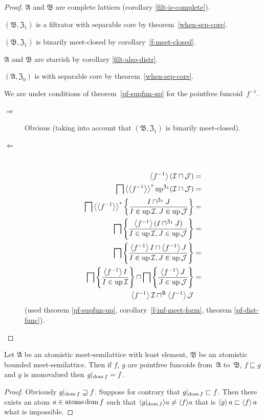 \begin{proof}
$\mathfrak{A}$ and $\mathfrak{B}$ are complete lattices (corollary
\ref{filt-is-complete}).

$(\mathfrak{B},\mathfrak{Z}_{1})$ is a filtrator with separable core
by theorem~\ref{when-sep-core}.

$(\mathfrak{B},\mathfrak{Z}_{1})$ is binarily meet-closed by
corollary~\ref{f-meet-closed}.

$\mathfrak{A}$ and $\mathfrak{B}$ are starrish by corollary \ref{filt-also-distr}.

$(\mathfrak{A},\mathfrak{Z}_{0})$ is with separable core by theorem~\ref{when-sep-core}.

We are under conditions of theorem~\ref{pf-supfun-up} for the pointfree funcoid~$f^{-1}$.
\begin{description}
\item [{$\Rightarrow$}] Obvious (taking into account that $(\mathfrak{B},\mathfrak{Z}_{1})$
is binarily meet-closed).
\item [{$\Leftarrow$}] ~
\begin{align*}
\left\langle f^{-1}\right\rangle(\mathcal{I}\sqcap\mathcal{J}) & =\\
\bigsqcap\left\langle \left\langle f^{-1}\right\rangle\right\rangle ^{\ast}\operatorname{up}^{\mathfrak{Z}_{1}}(\mathcal{I}\sqcap\mathcal{J}) & =\\
\bigsqcap\left\langle \left\langle f^{-1}\right\rangle\right\rangle ^{\ast}\left\{ \frac{I\sqcap^{\mathfrak{Z}_{1}}J}{I\in\operatorname{up}\mathcal{I},J\in\operatorname{up}\mathcal{J}}\right\} & =\\
\bigsqcap\left\{ \frac{\left\langle f^{-1}\right\rangle(I\sqcap^{\mathfrak{Z}_{1}}J)}{I\in\operatorname{up}\mathcal{I},J\in\operatorname{up}\mathcal{J}}\right\} & =\\
\bigsqcap\left\{ \frac{\left\langle f^{-1}\right\rangle I\sqcap\left\langle f^{-1}\right\rangle J}{I\in\operatorname{up}\mathcal{I},J\in\operatorname{up}\mathcal{J}}\right\} & =\\
\bigsqcap\left\{ \frac{\left\langle f^{-1}\right\rangle I}{I\in\operatorname{up}\mathcal{I}}\right\}\sqcap\bigsqcap\left\{ \frac{\left\langle f^{-1}\right\rangle J}{J\in\operatorname{up}\mathcal{J}}\right\} & =\\
\left\langle f^{-1}\right\rangle\mathcal{I}\sqcap^{\mathfrak{A}}\left\langle f^{-1}\right\rangle\mathcal{J}
\end{align*}
(used theorem \ref{pf-supfun-up}, corollary~\ref{f-inf-meet-form},
theorem \ref{pf-dist-func}).
\end{description}
\end{proof}
\begin{prop}
Let $\mathfrak{A}$ be an atomistic meet-semilattice with least element,
$\mathfrak{B}$ be an atomistic bounded meet-semilattice. Then if
$f$, $g$ are pointfree funcoids from~$\mathfrak{A}$ to~$\mathfrak{B}$,
$f\sqsubseteq g$ and $g$ is monovalued then $g|_{\operatorname{dom} f}=f$.\end{prop}
\begin{proof}
Obviously $g|_{\operatorname{dom} f}\sqsupseteq f$. Suppose for contrary that $g|_{\operatorname{dom} f}\sqsubset f$.
Then there exists an atom $a\in\operatorname{atoms}\operatorname{dom} f$ such that $\langle g|_{\operatorname{dom} f}\rangle a\neq\langle f\rangle a$
that is $\left\langle g\right\rangle a\sqsubset\left\langle f\right\rangle a$ what is impossible.
\end{proof}

